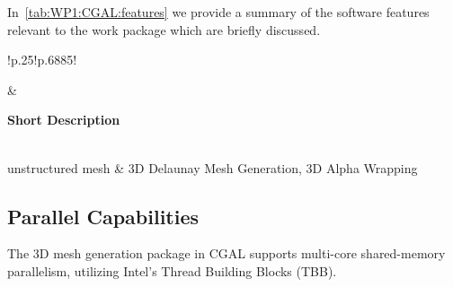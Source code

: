 In~\cref{tab:WP1:CGAL:features} we provide a summary of the software features relevant to the work package which are briefly discussed.

\begin{table}[h!]
    \centering
    { 
        \setlength{\parindent}{0pt}
        \def\arraystretch{1.25}
        {
            \fontsize{9}{11}\selectfont
            \begin{tabular}{!{\color{numpexgray}\vrule}p{.25\linewidth}!{\color{numpexgray}\vrule}p{.6885\linewidth}!{\color{numpexgray}\vrule}}
    
     &  {\rule{0pt}{2.5ex}\color{white}\bf Short Description }\\ 
    
    unstructured mesh & 3D Delaunay Mesh Generation, 3D Alpha Wrapping \\
\end{tabular}
        }
    }
    \caption{WP1: CGAL Features}
    \label{tab:WP1:CGAL:features}
\end{table}


\subsection{Parallel Capabilities}
\label{sec:WP1:CGAL:performances}



The 3D mesh generation package in CGAL supports multi-core shared-memory parallelism, 
utilizing Intel's Thread Building Blocks (TBB).



